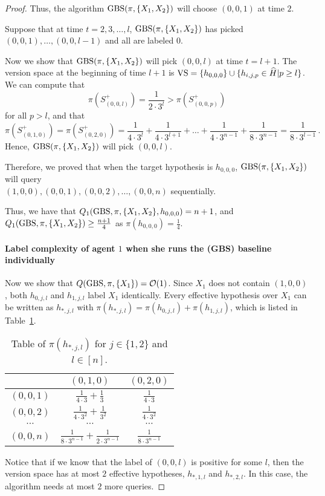 \begin{proof}
    Thus, the algorithm $\textrm{GBS}(\pi,\{X_1,X_2\})$ will choose $(0,0,1)$ at time $2$. 
    
    Suppose that at time $t=2,3,\ldots,l$, $\textrm{GBS}(\pi,\{X_1,X_2\})$ has picked $(0,0,1),\ldots, (0,0,l-1)$ and all are labeled $0$.
    
    Now we show that $\textrm{GBS}(\pi,\{X_1,X_2\})$ will pick $(0,0,l)$ at time $t= l+1$.
    The version space at the beginning of time $l+1$ is
    $\mathrm{VS} = \{h_{0,0,0}\}\cup \{h_{i,j,p}\in \widehat H|p\geq l\}$.
    We can compute that 
    \[\pi(S_{(0,0,l)}^+) = \frac{1}{2\cdot 3^l}> \pi(S_{(0,0,p)}^+)\] 
    for all $p>l$, and that 
    \[
    \pi(S_{(0,1,0)}^+) = \pi(S_{(0,2,0)}^+)= \frac{1}{4 \cdot 3^l} + \frac{1}{4 \cdot 3^{l+1}} + \ldots+\frac{1}{4 \cdot 3^{n-1}} + \frac{1}{8 \cdot 3^{n-1}} = \frac{1}{8 \cdot 3^{l-1}}\,.
    \]
    Hence, $\textrm{GBS}(\pi,\{X_1,X_2\})$ will pick $(0,0,l)$.
    
    Therefore, we proved that when the target hypothesis is $h_{0,0,0}$, $\textrm{GBS}(\pi,\{X_1,X_2\})$ will query \\
    $(1,0,0),(0,0,1), (0,0,2),\ldots, (0,0,n)$ sequentially. 
    
    Thus, we have that $Q_1(\textrm{GBS},\pi,\{X_1,X_2\},h_{0,0,0}) = n + 1$, and 
    $Q_1(\textrm{GBS},\pi,\{X_1,X_2\}) \geq \frac{n+1}{4}$ as $\pi(h_{0,0,0}) =\frac{1}{4}$.
    

\paragraph{Label complexity of agent $1$ when she runs the (GBS) baseline individually}
Now we show that $Q(\textrm{GBS},\pi,\{X_1\}) = \mathcal{O}(1)$. Since $X_1$ does not contain $(1,0,0)$, both $h_{0,j,l}$ and $h_{1,j,l}$ label $X_1$ identically. Every effective hypothesis over $X_1$ can be written as $h_{*,j,l}$ with $\pi(h_{*,j,l}) = \pi(h_{0,j,l})+\pi(h_{1,j,l})$, which is listed in Table~\ref{tab:pi-xjl}.
       \begin{table}[H]
        \centering
        \begin{tabular}{c|c|c}
             & $(0,1,0)$ & $(0,2,0)$\\\hline
            $(0,0,1)$ & $\frac{1}{4 \cdot 3} + \frac{1}{3}$ & $\frac{1}{4 \cdot 3}$\\\hline
            $(0,0,2)$ &$\frac{1}{4 \cdot 3^2}+ \frac{1}{3^2}$ & $\frac{1}{4 \cdot 3^2}$ \\\hline
            $\cdots$ & $\cdots$ & $\cdots$ \\\hline
            $(0,0,n)$ & $\frac{1}{8 \cdot 3^{n-1}} +\frac{1}{2 \cdot 3^{n-1}}$ & $\frac{1}{8 \cdot 3^{n-1}}$\\\hline
        \end{tabular}
        \caption{Table of $\pi(h_{*,j,l})$ for $j\in \{1,2\}$ and $l\in [n]$.}
        \label{tab:pi-xjl}
    \end{table}  
    Notice that if we know that the label of $(0,0,l)$ is positive for some $l$, then the version space has at most $2$ effective hypotheses, $h_{*,1,l}$ and $h_{*,2,l}$.
    In this case, the algorithm needs at most $2$ more queries.
    

\end{proof}
